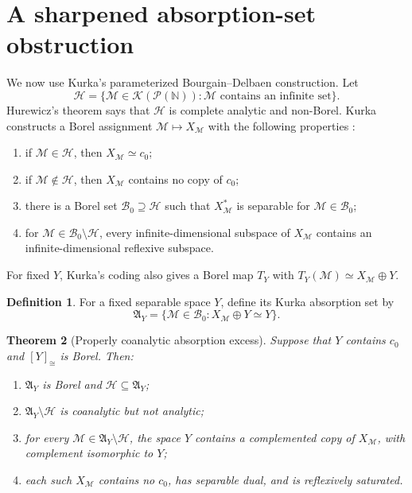 \documentclass[11pt]{article}
\newtheorem{theorem}{Theorem}[section]
\theoremstyle{definition}
\newtheorem{definition}[theorem]{Definition}
\newcommand{\czer}{c_0}
\newcommand{\K}{\mathcal K}
\newcommand{\PN}{\mathcal P(\mathbb N)}
\newcommand{\iso}{\simeq}
\newcommand{\class}[1]{[#1]_{\cong}}
\newcommand{\A}{\mathfrak A}
\newcommand{\Hh}{\mathcal H}
\newcommand{\Bzero}{\mathcal B_0}
\begin{document}
\section{A sharpened absorption-set obstruction}

We now use Kurka's parameterized Bourgain--Delbaen construction.  Let
\[
 \Hh=\{\mathcal M\in\K(\PN):\mathcal M\text{ contains an infinite set}\}.
\]
Hurewicz's theorem says that \(\Hh\) is complete analytic and non-Borel.  Kurka
constructs a Borel assignment \(\mathcal M\mapsto X_{\mathcal M}\) with the
following properties \cite[Propositions 4.5 and 4.7, Lemma 5.1]{Kurka}:
\begin{enumerate}[label=(K\arabic*)]
\item if \(\mathcal M\in\Hh\), then \(X_{\mathcal M}\iso\czer\);
\item if \(\mathcal M\notin\Hh\), then \(X_{\mathcal M}\) contains no
      copy of \(\czer\);
\item there is a Borel set \(\Bzero\supseteq\Hh\) such that
      \(X_{\mathcal M}^*\) is separable for \(\mathcal M\in\Bzero\);
\item for \(\mathcal M\in\Bzero\setminus\Hh\), every
      infinite-dimensional subspace of \(X_{\mathcal M}\) contains an
      infinite-dimensional reflexive subspace.
\end{enumerate}
For fixed \(Y\), Kurka's coding also gives a Borel map
\(T_Y\) with \(T_Y(\mathcal M)\iso X_{\mathcal M}\oplus Y\).

\begin{definition}
For a fixed separable space \(Y\), define its Kurka absorption set by
\[
 \A_Y=\{\mathcal M\in\Bzero:X_{\mathcal M}\oplus Y\iso Y\}.
\]
\end{definition}

\begin{theorem}[Properly coanalytic absorption excess]\label{thm:absorption}
Suppose that \(Y\) contains \(\czer\) and \(\class{Y}\) is Borel.  Then:
\begin{enumerate}[label=(\roman*)]
\item \(\A_Y\) is Borel and \(\Hh\subseteq\A_Y\);
\item \(\A_Y\setminus\Hh\) is coanalytic but not analytic;
\item for every \(\mathcal M\in\A_Y\setminus\Hh\), the space \(Y\)
      contains a complemented copy of \(X_{\mathcal M}\), with complement
      isomorphic to \(Y\);
\item each such \(X_{\mathcal M}\) contains no \(\czer\), has separable
      dual, and is reflexively saturated.
\end{enumerate}
\end{theorem}
\end{document}
